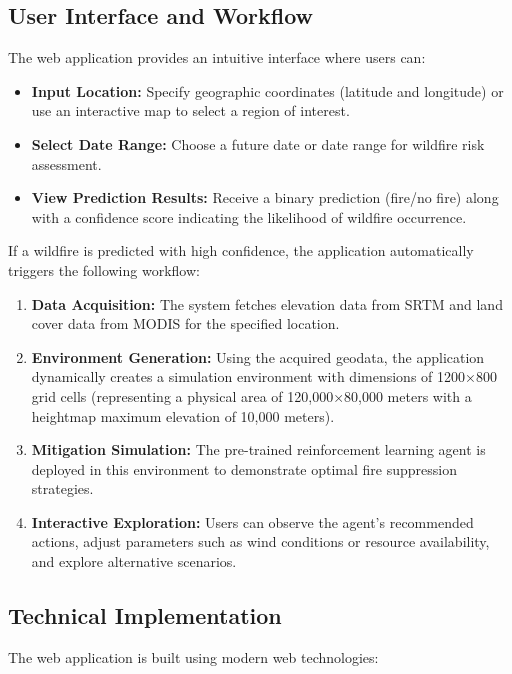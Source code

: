 \documentclass[conference]{IEEEtran}
\begin{document}
\subsection{User Interface and Workflow}
The web application provides an intuitive interface where users can:

\begin{itemize}
    \item \textbf{Input Location:} Specify geographic coordinates (latitude and longitude) or use an interactive map to select a region of interest.
    
    \item \textbf{Select Date Range:} Choose a future date or date range for wildfire risk assessment.
    
    \item \textbf{View Prediction Results:} Receive a binary prediction (fire/no fire) along with a confidence score indicating the likelihood of wildfire occurrence.
\end{itemize}

\noindent
If a wildfire is predicted with high confidence, the application automatically triggers the following workflow:

\begin{enumerate}
    \item \textbf{Data Acquisition:} The system fetches elevation data from SRTM and land cover data from MODIS for the specified location.
    
    \item \textbf{Environment Generation:} Using the acquired geodata, the application dynamically creates a simulation environment with dimensions of 1200×800 grid cells (representing a physical area of 120,000×80,000 meters with a heightmap maximum elevation of 10,000 meters).
    
    \item \textbf{Mitigation Simulation:} The pre-trained reinforcement learning agent is deployed in this environment to demonstrate optimal fire suppression strategies.
    
    \item \textbf{Interactive Exploration:} Users can observe the agent's recommended actions, adjust parameters such as wind conditions or resource availability, and explore alternative scenarios.
\end{enumerate}

\subsection{Technical Implementation}
The web application is built using modern web technologies:
\end{document}
